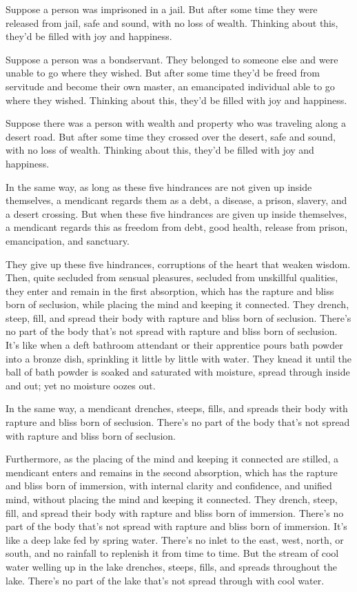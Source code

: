\documentclass[12pt,openany]{book}%
\begin{document}
Suppose a person was imprisoned in a jail. But after some time they were released from jail, safe and sound, with no loss of wealth. Thinking about this, they’d be filled with joy and happiness. 

Suppose a person was a bondservant. They belonged to someone else and were unable to go where they wished. But after some time they’d be freed from servitude and become their own master, an emancipated individual able to go where they wished. Thinking about this, they’d be filled with joy and happiness. 

Suppose there was a person with wealth and property who was traveling along a desert road. But after some time they crossed over the desert, safe and sound, with no loss of wealth. Thinking about this, they’d be filled with joy and happiness. 

In the same way, as long as these five hindrances are not given up inside themselves, a mendicant regards them as a debt, a disease, a prison, slavery, and a desert crossing. But when these five hindrances are given up inside themselves, a mendicant regards this as freedom from debt, good health, release from prison, emancipation, and sanctuary. 

They give up these five hindrances, corruptions of the heart that weaken wisdom. Then, quite secluded from sensual pleasures, secluded from unskillful qualities, they enter and remain in the first absorption, which has the rapture and bliss born of seclusion, while placing the mind and keeping it connected. They drench, steep, fill, and spread their body with rapture and bliss born of seclusion. There’s no part of the body that’s not spread with rapture and bliss born of seclusion. It’s like when a deft bathroom attendant or their apprentice pours bath powder into a bronze dish, sprinkling it little by little with water. They knead it until the ball of bath powder is soaked and saturated with moisture, spread through inside and out; yet no moisture oozes out. 

In the same way, a mendicant drenches, steeps, fills, and spreads their body with rapture and bliss born of seclusion. There’s no part of the body that’s not spread with rapture and bliss born of seclusion. 

Furthermore, as the placing of the mind and keeping it connected are stilled, a mendicant enters and remains in the second absorption, which has the rapture and bliss born of immersion, with internal clarity and confidence, and unified mind, without placing the mind and keeping it connected. They drench, steep, fill, and spread their body with rapture and bliss born of immersion. There’s no part of the body that’s not spread with rapture and bliss born of immersion. It’s like a deep lake fed by spring water. There’s no inlet to the east, west, north, or south, and no rainfall to replenish it from time to time. But the stream of cool water welling up in the lake drenches, steeps, fills, and spreads throughout the lake. There’s no part of the lake that’s not spread through with cool water. 
\end{document}
